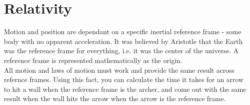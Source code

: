 \documentclass{article}
\begin{document}
\section{Relativity}
Motion and position are dependant on a specific inertial reference frame - some body with no apparent acceleration. It was believed by Aristotle that the Earth was the reference frame for everything, i.e. it was the center of the universe. A reference frame is represented mathematically as the origin.\\
All motion and laws of motion must work and provide the same result across refernce frames. Using this fact, you can calculate the time it takes for an arrow to hit a wall when the reference frame is the archer, and come out with the same result when the wall hits the arrow when the arrow is the reference frame.
\end{document}
